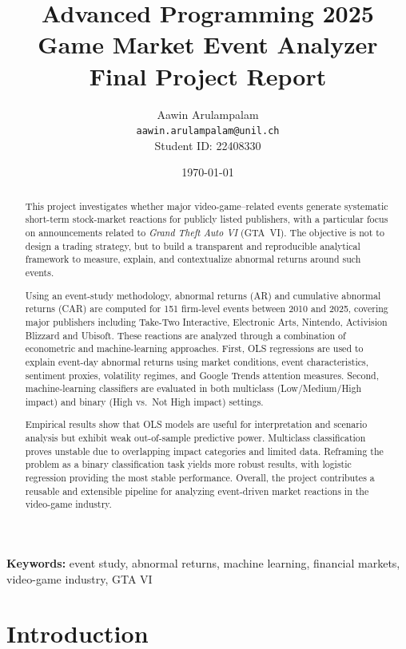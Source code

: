 \documentclass[11pt,a4paper]{article}
\title{%
    \Large \textbf{Advanced Programming 2025} \\
    \vspace{0.5cm}
    \LARGE \textbf{Game Market Event Analyzer} \\
    \vspace{0.3cm}
    \large Final Project Report
}
\author{
    Aawin Arulampalam \\
    \texttt{aawin.arulampalam@unil.ch} \\
    Student ID: 22408330
}
\date{\today}
\begin{document}
\maketitle
\thispagestyle{empty}

\begin{abstract}
\noindent
This project investigates whether major video-game–related events generate systematic short-term stock-market reactions for publicly listed publishers, with a particular focus on announcements related to \textit{Grand Theft Auto VI} (GTA~VI). The objective is not to design a trading strategy, but to build a transparent and reproducible analytical framework to measure, explain, and contextualize abnormal returns around such events.

Using an event-study methodology, abnormal returns (AR) and cumulative abnormal returns (CAR) are computed for 151 firm-level events between 2010 and 2025, covering major publishers including Take-Two Interactive, Electronic Arts, Nintendo, Activision Blizzard and Ubisoft. These reactions are analyzed through a combination of econometric and machine-learning approaches. First, OLS regressions are used to explain event-day abnormal returns using market conditions, event characteristics, sentiment proxies, volatility regimes, and Google Trends attention measures. Second, machine-learning classifiers are evaluated in both multiclass (Low/Medium/High impact) and binary (High vs.\ Not High impact) settings.

Empirical results show that OLS models are useful for interpretation and scenario analysis but exhibit weak out-of-sample predictive power. Multiclass classification proves unstable due to overlapping impact categories and limited data. Reframing the problem as a binary classification task yields more robust results, with logistic regression providing the most stable performance. Overall, the project contributes a reusable and extensible pipeline for analyzing event-driven market reactions in the video-game industry.
\end{abstract}

\vspace{0.5cm}
\noindent\textbf{Keywords:} event study, abnormal returns, machine learning, financial markets, video-game industry, GTA VI

\newpage
\tableofcontents
\newpage
\section{Introduction}
\label{sec:introduction}
\end{document}
